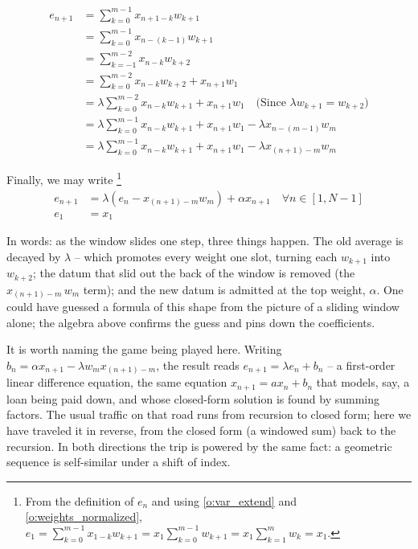 \documentclass{article}
\begin{document}
\begin{align*}
    e_{n+1} &=  \sum_{k=0}^{m-1} x_{n+1-k} w_{k+1} \\
        &=  \sum_{k=0}^{m-1} x_{n-(k-1)} w_{k+1} \\
        &=  \sum_{k=-1}^{m-2} x_{n-k} w_{k+2}  \\
        &=  \sum_{k=0}^{m-2} x_{n-k} w_{k+2}  + x_{n+1} w_1 \\
        &=  \lambda \sum_{k=0}^{m-2} x_{n-k} w_{k+1}  + x_{n+1} w_1  \quad \text{(Since $\lambda w_{k+1} = w_{k+2}$)} \\
        &=  \lambda \sum_{k=0}^{m-1} x_{n-k} w_{k+1}  + x_{n+1} w_1  
                - \lambda x_{n-(m-1)} w_m  \\
        &=  \lambda \sum_{k=0}^{m-1} x_{n-k} w_{k+1}  + x_{n+1} w_1  
                - \lambda x_{(n+1)-m} w_m  
\end{align*}

Finally, we may write%
\footnote{From the definition of $e_n$ and using
	\eqref{o:var_extend} and \eqref{o:weights_normalized},
$e_1 = \sum_{k=0}^{m-1} x_{1-k} w_{k+1} = x_1 \sum_{k=0}^{m-1} w_{k+1} = x_1 \sum_{k=1}^m w_k = x_1$.}
\begin{align}
    e_{n+1} &=  \lambda \left(e_n - x_{(n+1) - m} w_m \right) + \alpha x_{n+1} \quad \forall n \in [1, N-1] \\
    e_1     &=  x_1
\end{align}

In words: as the window slides one step, three things happen. The old
average is decayed by $\lambda$ -- which promotes every weight one slot,
turning each $w_{k+1}$ into $w_{k+2}$; the datum that slid out the back of
the window is removed (the $x_{(n+1)-m}\, w_m$ term); and the new datum is
admitted at the top weight, $\alpha$. One could have guessed a formula of
this shape from the picture of a sliding window alone; the algebra above
confirms the guess and pins down the coefficients.

It is worth naming the game being played here. Writing
$b_n = \alpha x_{n+1} - \lambda w_m x_{(n+1)-m}$, the result reads
$e_{n+1} = \lambda e_n + b_n$ -- a first-order linear difference equation,
the same equation $x_{n+1} = a x_n + b_n$ that models, say, a loan being
paid down, and whose closed-form solution is found by summing factors.
The usual traffic on that road runs from recursion to closed form; here we
have traveled it in reverse, from the closed form (a windowed sum) back to
the recursion. In both directions the trip is powered by the same fact:
a geometric sequence is self-similar under a shift of index.
\end{document}

